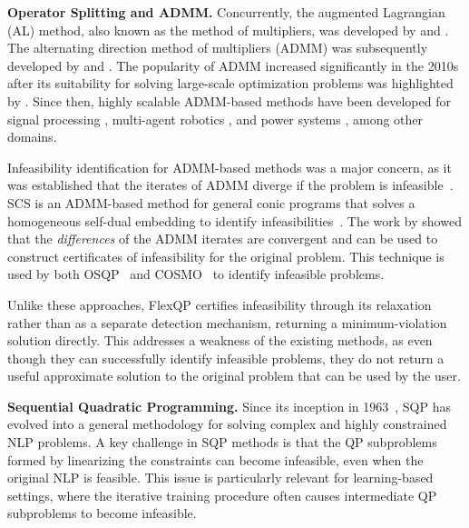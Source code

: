 \documentclass{article} %
\begin{document}
\textbf{Operator Splitting and ADMM.}
Concurrently, the augmented Lagrangian (AL) method, also known as the method of multipliers, was developed by \citet{Hestenes1969Multiplier} and \citet{Powell1969Method}.
The alternating direction method of multipliers (ADMM) was subsequently developed by \citet{Glowinski1975Approximation} and \citet{Gabay1976Dual}.
%
The popularity of ADMM increased significantly in the 2010s after its suitability for solving large-scale optimization problems was highlighted by \citet{boyd2011distributed}. Since then, highly scalable ADMM-based methods have been developed for signal processing \citep{mateos2010distributed, zhang2014asynchronous}, multi-agent robotics \citep{Saravanos-RSS-21, saravanos2023distributed_ddp, abdul2025scaling}, and power systems \citep{erseghe2014distributed, mhanna2018adaptive, xu2018admm}, among other domains.

Infeasibility identification for ADMM-based methods was a major concern, as it was established that the iterates of ADMM diverge if the problem is infeasible~\citep{Eckstein1992Douglas}.
SCS is an ADMM-based method for general conic programs that solves a homogeneous self-dual embedding to identify infeasibilities~\citep{odonoghue2016conic}.
The work by \citet{banjac2019infeasibility} showed that the \emph{differences} of the ADMM iterates are convergent and can be used to construct certificates of infeasibility for the original problem.
This technique is used by both OSQP~\citep{stellato2020osqp} and COSMO~\citep{garstka2021cosmo} to identify infeasible problems.

Unlike these approaches, FlexQP certifies infeasibility through its relaxation rather than as a separate detection mechanism, returning a minimum-violation solution directly.
This addresses a weakness of the existing methods, as even though they can successfully identify infeasible problems, they do not return a useful approximate solution to the original problem that can be used by the user.


\textbf{Sequential Quadratic Programming.}
Since its inception in 1963~\citep{Wilson1963Simplicial}, SQP has evolved into a general methodology for solving complex and highly constrained NLP problems.
A key challenge in SQP methods is that the QP subproblems formed by linearizing the constraints can become infeasible, even when the original NLP is feasible.
This issue is particularly relevant for learning-based settings, where the iterative training procedure often causes intermediate QP subproblems to become infeasible.
\end{document}
